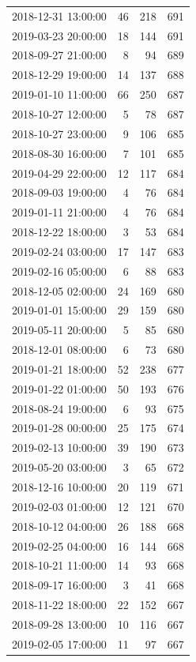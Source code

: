 \begin{tabular}{lrrr}
2018-12-31 13:00:00 & 46 & 218 & 691 \\
2019-03-23 20:00:00 & 18 & 144 & 691 \\
2018-09-27 21:00:00 & 8 & 94 & 689 \\
2018-12-29 19:00:00 & 14 & 137 & 688 \\
2019-01-10 11:00:00 & 66 & 250 & 687 \\
2018-10-27 12:00:00 & 5 & 78 & 687 \\
2018-10-27 23:00:00 & 9 & 106 & 685 \\
2018-08-30 16:00:00 & 7 & 101 & 685 \\
2019-04-29 22:00:00 & 12 & 117 & 684 \\
2018-09-03 19:00:00 & 4 & 76 & 684 \\
2019-01-11 21:00:00 & 4 & 76 & 684 \\
2018-12-22 18:00:00 & 3 & 53 & 684 \\
2019-02-24 03:00:00 & 17 & 147 & 683 \\
2019-02-16 05:00:00 & 6 & 88 & 683 \\
2018-12-05 02:00:00 & 24 & 169 & 680 \\
2019-01-01 15:00:00 & 29 & 159 & 680 \\
2019-05-11 20:00:00 & 5 & 85 & 680 \\
2018-12-01 08:00:00 & 6 & 73 & 680 \\
2019-01-21 18:00:00 & 52 & 238 & 677 \\
2019-01-22 01:00:00 & 50 & 193 & 676 \\
2018-08-24 19:00:00 & 6 & 93 & 675 \\
2019-01-28 00:00:00 & 25 & 175 & 674 \\
2019-02-13 10:00:00 & 39 & 190 & 673 \\
2019-05-20 03:00:00 & 3 & 65 & 672 \\
2018-12-16 10:00:00 & 20 & 119 & 671 \\
2019-02-03 01:00:00 & 12 & 121 & 670 \\
2018-10-12 04:00:00 & 26 & 188 & 668 \\
2019-02-25 04:00:00 & 16 & 144 & 668 \\
2018-10-21 11:00:00 & 14 & 93 & 668 \\
2018-09-17 16:00:00 & 3 & 41 & 668 \\
2018-11-22 18:00:00 & 22 & 152 & 667 \\
2018-09-28 13:00:00 & 10 & 116 & 667 \\
2019-02-05 17:00:00 & 11 & 97 & 667 \\

\end{tabular}
